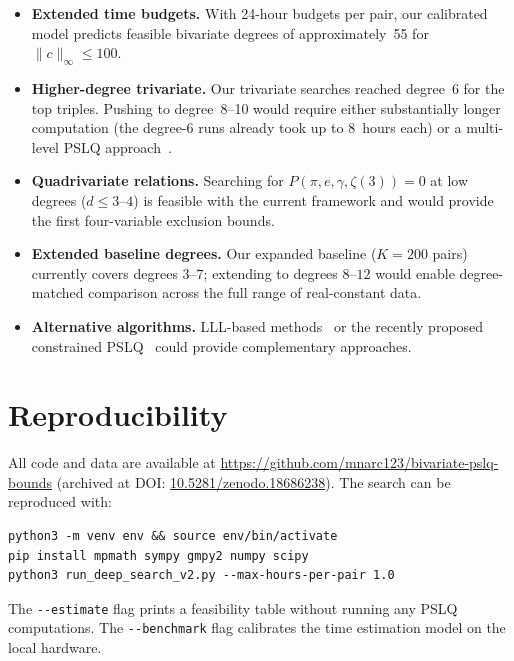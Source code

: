 \documentclass[11pt]{amsart}
\theoremstyle{remark}
\newcommand{\norm}[1]{\lVert #1 \rVert}
\begin{document}
\begin{itemize}
\item \textbf{Extended time budgets.} With 24-hour budgets per pair, our calibrated
  model predicts feasible bivariate degrees of approximately~55 for
  $\norm{c}_\infty\le 100$.

\item \textbf{Higher-degree trivariate.} Our trivariate searches reached degree~6
  for the top triples. Pushing to degree~8--10 would require either substantially
  longer computation (the degree-6 runs already took up to 8~hours each) or a
  multi-level PSLQ approach~\cite{BaileyBroadhurst2001}.

\item \textbf{Quadrivariate relations.} Searching for
  $P(\pi,e,\gamma,\zeta(3))=0$ at low degrees ($d\le 3$--$4$) is feasible with
  the current framework and would provide the first four-variable exclusion bounds.

\item \textbf{Extended baseline degrees.} Our expanded baseline ($K=200$ pairs)
  currently covers degrees $3$--$7$; extending to degrees $8$--$12$ would
  enable degree-matched comparison across the full range of real-constant data.

\item \textbf{Alternative algorithms.} LLL-based methods~\cite{LLL1982} or the
  recently proposed constrained PSLQ~\cite{CraigWood2025} could provide
  complementary approaches.
\end{itemize}

\section{Reproducibility}\label{sec:reproducibility}

All code and data are available at
\url{https://github.com/mnarc123/bivariate-pslq-bounds}
(archived at DOI:
\href{https://doi.org/10.5281/zenodo.18686238}{10.5281/zenodo.18686238}).
The search can be reproduced with:

\begin{verbatim}
python3 -m venv env && source env/bin/activate
pip install mpmath sympy gmpy2 numpy scipy
python3 run_deep_search_v2.py --max-hours-per-pair 1.0
\end{verbatim}

The \texttt{-{}-estimate} flag prints a feasibility table without running any PSLQ
computations. The \texttt{-{}-benchmark} flag calibrates the time estimation model on
the local hardware.
\end{document}
